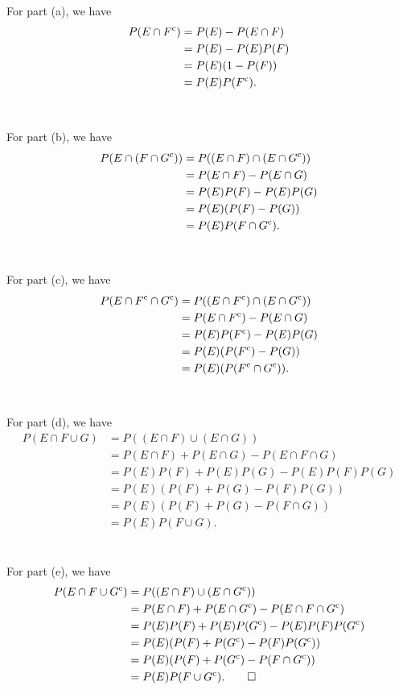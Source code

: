 \begin{solution*}
  For part (a), we have
  \begin{align*}
    P(E\cap F^{\mathrm{c}})
    &=P(E)-P(E\cap F)\\
    &=P(E)-P(E)P(F)\\
    &=P(E)(1-P(F))\\
    &=P(E)P(F^{\mathrm{c}}).
  \end{align*}
  \\\\
  For part (b), we have
  \begin{align*}
    P(E\cap (F\cap G^{\mathrm{c}}))
    &=P((E\cap F)\cap(E\cap G^{\mathrm{c}}))\\
    &=P(E\cap F)-P(E\cap G)\\
    &=P(E)P(F)-P(E)P(G)\\
    &=P(E)(P(F)-P(G))\\
    &=P(E)P(F\cap G^{\mathrm{c}}).
  \end{align*}
  \\\\
  For part (c), we have
  \begin{align*}
    P(E\cap F^{\mathrm{c}}\cap G^{\mathrm{c}})
    &=P((E\cap F^{\mathrm{c}})\cap(E\cap G^{\mathrm{c}}))\\
    &=P(E\cap F^{\mathrm{c}})-P(E\cap G)\\
    &=P(E)P(F^{\mathrm{c}})-P(E)P(G)\\
    &=P(E)(P(F^{\mathrm{c}})-P(G))\\
    &=P(E)(P(F^{\mathrm{c}}\cap G^{\mathrm{c}})).
  \end{align*}
  \\\\
  For part (d), we have
  \begin{align*}
    P(E\cap F\cup G)
    &=P((E\cap F)\cup (E\cap G))\\
    &=P(E\cap F)+P(E\cap G)-P(E\cap F\cap G)\\
    &=P(E)P(F)+P(E)P(G)-P(E)P(F)P(G)\\
    &=P(E)(P(F)+P(G)-P(F)P(G))\\
    &=P(E)(P(F)+P(G)-P(F\cap G))\\
    &=P(E)P(F\cup G).
  \end{align*}
  \\\\
  For part (e), we have
  \begin{align*}
    P(E\cap F\cup G^{\mathrm{c}})
    &=P((E\cap F)\cup(E\cap G^{\mathrm{c}}))\\
    &=P(E\cap F)+P(E\cap G^{\mathrm{c}})-P(E\cap F\cap G^{\mathrm{c}})\\
    &=P(E)P(F)+P(E)P(G^{\mathrm{c}})-P(E)P(F)P(G^{\mathrm{c}})\\
    &=P(E)(P(F)+P(G^{\mathrm{c}})-P(F)P(G^{\mathrm{c}}))\\
    &=P(E)(P(F)+P(G^{\mathrm{c}})-P(F\cap G^{\mathrm{c}}))\\
    &=P(E)P(F\cup G^{\mathrm{c}}).\qedhere
  \end{align*}
\end{solution*}


